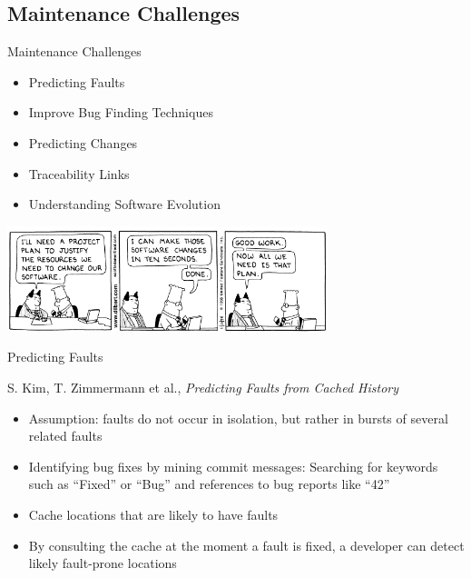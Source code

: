 \note{
}

\subsection{Maintenance Challenges}

\begin{frame}{Maintenance Challenges}
  \begin{itemize}
  \item Predicting Faults
  \item Improve Bug Finding Techniques
  \item Predicting Changes
  \item Traceability Links
  \item Understanding Software Evolution
  \end{itemize}


  \begin{center}
    \includegraphics[width=0.7\textwidth]{figures/dilbert-software-changes}
  \end{center}
\end{frame}

\note{
}

\begin{frame}{Predicting Faults}
  \begin{thebibliography}
    \beamertemplatearticlebibitems
    S. Kim, T. Zimmermann et al., {\em Predicting Faults from Cached
      History}
  \end{thebibliography}


  \begin{itemize}
  \item Assumption: faults do not occur in isolation, but rather in
    bursts of several related faults
  \item Identifying bug fixes by mining commit messages: Searching for
    keywords such as ``Fixed'' or ``Bug'' and references to bug
    reports like ``42''
  \item Cache locations that are likely to have faults
  \item By consulting the cache at the moment a fault is fixed, a
    developer can detect likely fault-prone locations
  \end{itemize}
\end{frame}

